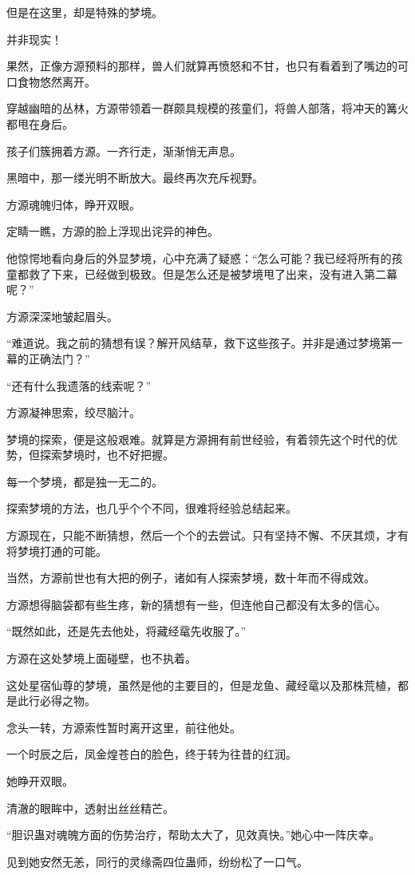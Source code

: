 \begin{this_body}
但是在这里，却是特殊的梦境。

并非现实！

果然，正像方源预料的那样，兽人们就算再愤怒和不甘，也只有看着到了嘴边的可口食物悠然离开。

穿越幽暗的丛林，方源带领着一群颇具规模的孩童们，将兽人部落，将冲天的篝火都甩在身后。

孩子们簇拥着方源。一齐行走，渐渐悄无声息。

黑暗中，那一缕光明不断放大。最终再次充斥视野。

方源魂魄归体，睁开双眼。

定睛一瞧，方源的脸上浮现出诧异的神色。

他惊愕地看向身后的外显梦境，心中充满了疑惑：“怎么可能？我已经将所有的孩童都救了下来，已经做到极致。但是怎么还是被梦境甩了出来，没有进入第二幕呢？”

方源深深地皱起眉头。

“难道说。我之前的猜想有误？解开风结草，救下这些孩子。并非是通过梦境第一幕的正确法门？”

“还有什么我遗落的线索呢？”

方源凝神思索，绞尽脑汁。

梦境的探索，便是这般艰难。就算是方源拥有前世经验，有着领先这个时代的优势，但探索梦境时，也不好把握。

每一个梦境，都是独一无二的。

探索梦境的方法，也几乎个个不同，很难将经验总结起来。

方源现在，只能不断猜想，然后一个个的去尝试。只有坚持不懈、不厌其烦，才有将梦境打通的可能。

当然，方源前世也有大把的例子，诸如有人探索梦境，数十年而不得成效。

方源想得脑袋都有些生疼，新的猜想有一些，但连他自己都没有太多的信心。

“既然如此，还是先去他处，将藏经鼋先收服了。”

方源在这处梦境上面碰壁，也不执着。

这处星宿仙尊的梦境，虽然是他的主要目的，但是龙鱼、藏经鼋以及那株荒植，都是此行必得之物。

念头一转，方源索性暂时离开这里，前往他处。

一个时辰之后，凤金煌苍白的脸色，终于转为往昔的红润。

她睁开双眼。

清澈的眼眸中，透射出丝丝精芒。

“胆识蛊对魂魄方面的伤势治疗，帮助太大了，见效真快。”她心中一阵庆幸。

见到她安然无恙，同行的灵缘斋四位蛊师，纷纷松了一口气。


\end{this_body}
